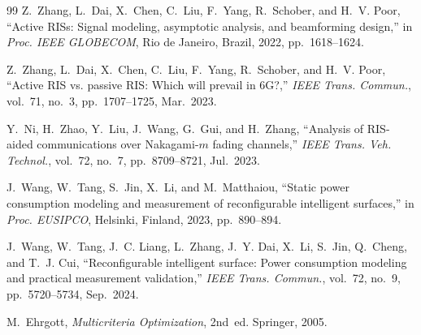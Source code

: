 \documentclass[journal]{IEEEtran}
\begin{document}
\begin{thebibliography}{99}
Z.~Zhang, L.~Dai, X.~Chen, C.~Liu, F.~Yang, R.~Schober, and H.~V. Poor,
``Active RISs: Signal modeling, asymptotic analysis, and beamforming design,''
in \emph{Proc. IEEE GLOBECOM}, Rio de Janeiro, Brazil, 2022, pp.~1618--1624.

Z.~Zhang, L.~Dai, X.~Chen, C.~Liu, F.~Yang, R.~Schober, and H.~V. Poor,
``Active RIS vs. passive RIS: Which will prevail in 6G?,''
\emph{IEEE Trans. Commun.}, vol.~71, no.~3, pp.~1707--1725, Mar.~2023.

Y.~Ni, H.~Zhao, Y.~Liu, J.~Wang, G.~Gui, and H.~Zhang,
``Analysis of RIS-aided communications over Nakagami-$m$ fading channels,''
\emph{IEEE Trans. Veh. Technol.}, vol.~72, no.~7, pp.~8709--8721, Jul.~2023.

J.~Wang, W.~Tang, S.~Jin, X.~Li, and M.~Matthaiou,
``Static power consumption modeling and measurement of reconfigurable intelligent surfaces,''
in \emph{Proc. EUSIPCO}, Helsinki, Finland, 2023, pp.~890--894.

J.~Wang, W.~Tang, J.~C. Liang, L.~Zhang, J.~Y. Dai, X.~Li, S.~Jin, Q.~Cheng, and T.~J. Cui,
``Reconfigurable intelligent surface: Power consumption modeling and practical measurement validation,''
\emph{IEEE Trans. Commun.}, vol.~72, no.~9, pp.~5720--5734, Sep.~2024.

M.~Ehrgott, \emph{Multicriteria Optimization}, 2nd~ed. Springer, 2005.

\end{thebibliography}
\endgroup
\end{document}
